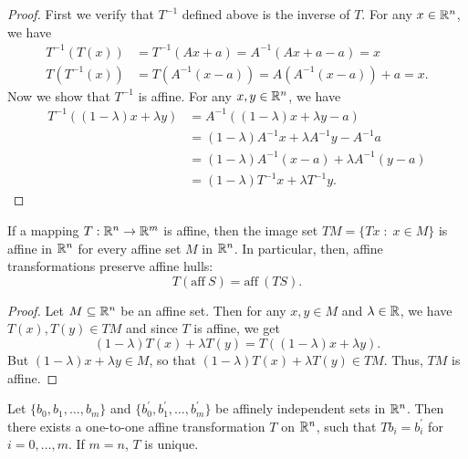 \documentclass[11pt,a4paper]{article}
\begin{document}
\begin{proof}
    First we verify that $T^{-1}$ defined above is the inverse of $T$. For any $x\in\mathbb{R}^n$, we have
    \begin{align*}
        T^{-1}(T(x)) &= T^{-1}(Ax+a) = A^{-1}(Ax+a-a) = x \\
        T(T^{-1}(x)) &= T(A^{-1}(x-a)) = A(A^{-1}(x-a)) + a = x.
    \end{align*}
% 
    Now we show that $T^{-1}$ is affine. For any $x,y\in \mathbb{R}^n$, we have
    \begin{align*}
        T^{-1}((1-\lambda)x + \lambda y) &= A^{-1}((1-\lambda)x + \lambda y - a)\\
        &= (1-\lambda)A^{-1}x + \lambda A^{-1} y - A^{-1} a \\
        &= (1-\lambda)A^{-1}(x-a) + \lambda A^{-1} (y-a) \\
        &= (1-\lambda)T^{-1}x + \lambda T^{-1} y.
    \end{align*}
\end{proof}

\begin{proposition}
    If a mapping $T:\mathbb{R}^n\rightarrow \mathbb{R}^m$ is affine, then the image set $TM = \{Tx\;:\;x\in M\}$ is affine in $\mathbb{R}^n$ for every affine set $M$ in $\mathbb{R}^n$. In particular, then, affine transformations preserve affine hulls:
    \begin{equation*}
        T(\text{aff}\ S) = \text{aff}\ (TS).
    \end{equation*}
\end{proposition}

\begin{proof}
    Let $M\subseteq \mathbb{R}^n$ be an affine set. Then for any $x,y\in M$ and $\lambda\in\mathbb{R}$, we have $T(x),T(y)\in TM$ and since $T$ is affine, we get 
    \begin{equation*}
        (1-\lambda)T(x) + \lambda T(y) = T((1-\lambda)x + \lambda y).
    \end{equation*}
    But $(1-\lambda)x + \lambda y\in M$, so that $(1-\lambda)T(x) + \lambda T(y)\in TM$. Thus, $TM$ is affine.
\end{proof}

\begin{theorem}
    Let $\{b_0,b_1,\ldots,b_m\}$ and $\{b_0^\prime,b_1^\prime,\ldots, b_m^\prime\}$ be affinely independent sets in $\mathbb{R}^n$. Then there exists a one-to-one affine transformation $T$ on $\mathbb{R}^n$, such that $Tb_i = b_i^\prime$ for $i = 0,\ldots,m$. If $m = n$, $T$ is unique.
\end{theorem}
\end{document}
